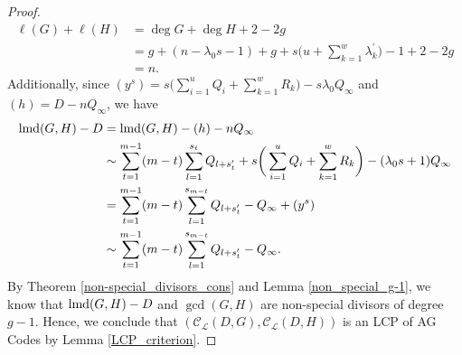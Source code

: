 \documentclass[journal,12pt,onecolumn]{IEEEtran}
\begin{document}
\begin{proof}
    \begin{align*}
        \ell(G) + \ell (H) & = \deg G + \deg H +2- 2g \\
        & = g+ (n-\lambda_0s-1) + g + s\bigg(u + \sum_{k=1}^w\lambda_k^\prime\bigg) -1 +2 -2g\\
        & = n . 
    \end{align*}
    Additionally, since $(y^s) = s\big(\sum_{i=1}^uQ_i+\sum_{k=1}^wR_k\big)-s\lambda_0Q_\infty$ and $(h)=D-nQ_\infty$, we have 
    \begin{align*}
        {\rm lmd}(G,H)- D &= {\rm lmd}(G,H)-(h)-nQ_\infty\\
        &\sim \sum_{t=1}^{m-1}(m-t)\sum_{l=1}^{s_t}Q_{l+s_t^\prime} +  s\bigg( \sum_{i=1}^uQ_i + \sum_{k=1}^wR_k \bigg) - (\lambda_0s+1)Q_\infty \\
        &= \sum_{t=1}^{m-1}(m-t)\sum_{l=1}^{s_{m-t}}Q_{l+s_t^\prime} - Q_\infty + (y^s) \\
        & \sim \sum_{t=1}^{m-1}(m-t)\sum_{l=1}^{s_{m-t}}Q_{l+s_t^\prime} - Q_\infty. 
    \end{align*}
    By Theorem \ref{non-special_divisors_cons} and Lemma \ref{non_special_g-1}, we know that ${\rm lmd}(G,H)-D$ and $\gcd (G,H)$ are non-special divisors of degree $g-1$. Hence, we conclude that $(\mathcal{C}_{\mathcal{L}}(D,G),\mathcal{C}_{\mathcal{L}}(D,H))$ is an LCP of AG Codes by Lemma \ref{LCP_criterion}. 


\end{proof}
\end{document}
